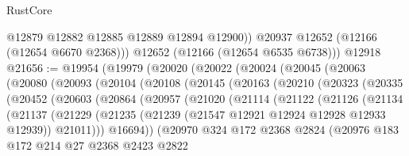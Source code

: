 \begin{lexlean}{RustCore}
\begin{coremodule}
            @12879
            @12882
            @12885
            @12889
            @12894
            @12900))
        @20937
        @12652
        (@12166 (@12654 @6670 @2368)))
      @12652
      (@12166 (@12654 @6535 @6738)))
    @12918
@21656 := @19954
    (@19979
      (@20020
        (@20022
          (@20024
            (@20045
              (@20063
                (@20080
                  (@20093
                    (@20104
                      (@20108
                        (@20145
                          (@20163
                            (@20210
                              (@20323
                                (@20335
                                  (@20452
                                    (@20603
                                      (@20864
                                        (@20957
                                          (@21020
                                            (@21114
                                              (@21122
                                                (@21126
                                                  (@21134
                                                    (@21137
                                                      (@21229
                                                        (@21235
                                                          (@21239
                                                            (@21547
                                                              @12921
                                                              @12924
                                                              @12928
                                                              @12933
                                                              @12939))
                                                          @21011)))
                                                    @16694))
                                                (@20970
                                                  @324
                                                  @172
                                                  @2368
                                                  @2824
                                                  (@20976
                                                    @183
                                                    @172
                                                    @214
                                                    @27
                                                    @2368
                                                    @2423
                                                    @2822

\end{coremodule}
\end{lexlean}
